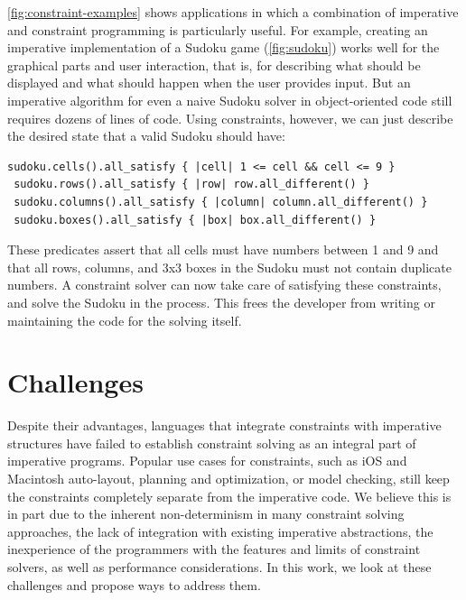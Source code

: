 \autoref{fig:constraint-examples} shows applications in which a combination of
imperative and constraint programming is particularly useful. For example,
creating an imperative implementation of a Sudoku game (\autoref{fig:sudoku})
works well for the graphical parts and user interaction, that is, for describing
what should be displayed and what should happen when the user provides
input. But an imperative algorithm for even a naive Sudoku solver in
object-oriented code still requires dozens of lines of code. Using constraints,
however, we can just describe the desired state that a valid Sudoku should have:
\begin{lstlisting}[frame=none]
 sudoku.cells().all_satisfy { |cell| 1 <= cell && cell <= 9 }
 sudoku.rows().all_satisfy { |row| row.all_different() }
 sudoku.columns().all_satisfy { |column| column.all_different() }
 sudoku.boxes().all_satisfy { |box| box.all_different() }
\end{lstlisting}
These predicates assert that all cells must have numbers between 1 and 9 and
that all rows, columns, and 3x3 boxes in the Sudoku must not contain duplicate
numbers. A constraint solver can now take care of satisfying these constraints,
and solve the Sudoku in the process. This frees the developer from writing or
maintaining the code for the solving itself.


\section{Challenges}
\label{sec:challenges}

Despite their advantages, languages that integrate constraints with imperative
structures have failed to establish constraint solving as an integral part of
imperative programs. Popular use cases for constraints, such as iOS and
Macintosh auto-layout, planning and optimization, or model checking, still keep
the constraints completely separate from the imperative code. We believe this is
in part due to the inherent non-determinism in many constraint solving
approaches, the lack of integration with existing imperative abstractions, the
inexperience of the programmers with the features and limits of constraint
solvers, as well as performance considerations. In this work, we look at these
challenges and propose ways to address them.

